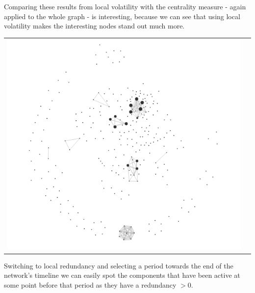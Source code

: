 \begin{center}
\end{center}
Comparing these results from local volatility with the centrality measure - again applied to the whole graph - is interesting, because we can see that using local volatility makes the interesting nodes stand out much more. 
\begin{center}
\begin{tabular}{cc}
\label{edgeTypes}
\includegraphics[trim={0 0 0 0}, width=140mm]{./Figures/TurinLocalRedundancy1.png}
\end{tabular}
\end{center}
Switching to local redundancy and selecting a period towards the end of the network's timeline we can easily spot the components that have been active at some point before that period as they have a redundancy $> 0$.



